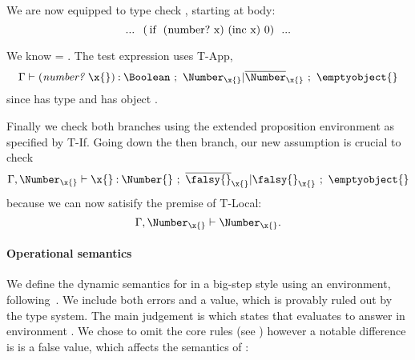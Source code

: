 {We are now equipped to type check
, starting at body:
$$
\clj{... (if (number? x) (inc x) 0) ...}
$$

We know {\propenv{}} = {\isprop{\UnionNilNum{}}{\x{}}}.
The test expression uses T-App, 
$$
\judgement{\propenv{}}{\hastype{\appexp{\numberhuh{}}{\x{}}}{\Boolean}}{\filterset{\isprop{\Number}{\x{}}}{\notprop{\Number}{\x{}}}}{\emptyobject{}}
$$
since \numberhuh{} has type
{\ArrowOne{\x{}}{\Top}{\Boolean}
        {\filterset{\isprop{\Number}{\x{}}}{\notprop{\Number}{\x{}}}}{\emptyobject{}}}
      and \x{} has object \x{}.

Finally we check both branches using the extended proposition environment as specified by T-If.
Going down the then branch, our new assumption {\isprop{\Number}{\x{}}} is crucial to check
$$
\judgement{{\propenv{}},{\isprop{\Number}{\x{}}}}{\hastype{\x{}}{\Number{}}}{\filterset{\notprop{\falsy{}}{\x{}}}{\isprop{\falsy{}}{\x{}}}}{\emptyobject{}}
$$
because we can now satisify the premise of T-Local:
$$
\inpropenv{{\propenv{}},\isprop{\Number}{\x{}}}{\isprop{\Number}{\x{}}}.
$$


\paragraph{Operational semantics} We define the dynamic semantics for \lambdatc{}
in a big-step style using an environment, following~\citet{TF10}.
We include both errors and a \wrong{} value, which is provably ruled out by the
type system.
The main judgement is 
which states that \e{} evaluates to answer  in environment
\openv{}. We chose to omit the core rules (see )
however a notable difference is \nil{} is a false value, which affects the
semantics of \ifliteral{}:

}
